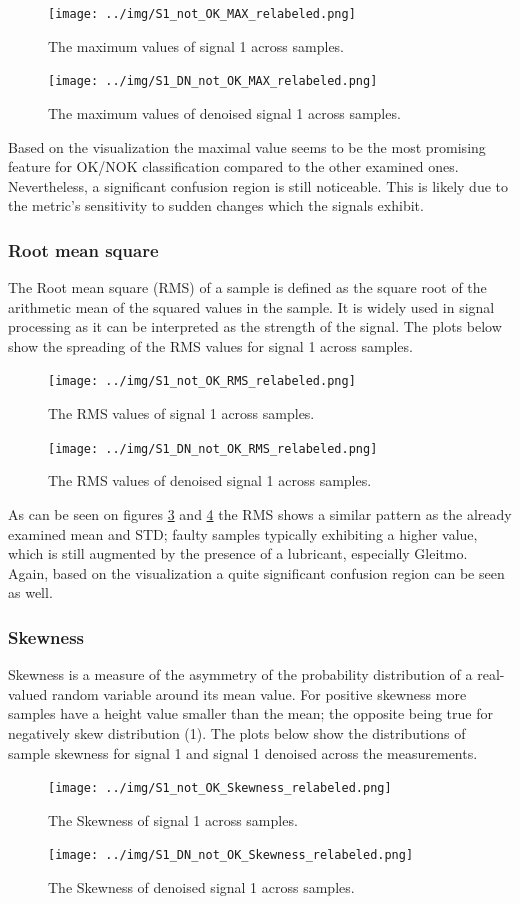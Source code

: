 \documentclass[12pt]{report}
\begin{document}
\begin{figure}[H]
	\texttt{[image: ../img/S1\_not\_OK\_MAX\_relabeled.png]}
	\caption{The maximum values of signal 1 across samples.}
	\label{fig:S1MAX}
\end{figure}
\begin{figure}[H]
	\texttt{[image: ../img/S1\_DN\_not\_OK\_MAX\_relabeled.png]}
	\caption{The maximum values of denoised signal 1 across samples.}
	\label{fig:S1DNMAX}
\end{figure}
Based on the visualization the maximal value seems to be the most promising feature for OK/NOK classification compared to the other examined ones. Nevertheless, a significant confusion region is still noticeable. This is likely due to the metric’s sensitivity to sudden changes which the signals exhibit.

\subsubsection{Root mean square}
The Root mean square (RMS) of a sample is defined as the square root of the arithmetic mean of the squared values in the sample. It is widely used in signal processing as it can be interpreted as the strength of the signal. The plots below show the spreading of the RMS values for signal 1 across samples.
\begin{figure}[H]
	\texttt{[image: ../img/S1\_not\_OK\_RMS\_relabeled.png]}
	\caption{The RMS values of signal 1 across samples.}
	\label{fig:S1RMS}
\end{figure}
\begin{figure}[H]
	\texttt{[image: ../img/S1\_DN\_not\_OK\_RMS\_relabeled.png]}
	\caption{The RMS values of denoised signal 1 across samples.}
	\label{fig:S1DNRMS}
\end{figure}
As can be seen on figures \ref{fig:S1RMS} and \ref{fig:S1DNRMS} the RMS shows a similar pattern as the already examined mean and STD; faulty samples typically exhibiting a higher value, which is still augmented by the presence of a lubricant, especially Gleitmo. Again, based on the visualization a quite significant confusion region can be seen as well.

\subsubsection{Skewness}
Skewness is a measure of the asymmetry of the probability distribution of a real-valued random variable around its mean value. For positive skewness more samples have a height value smaller than the mean; the opposite being true for negatively skew distribution (1). The plots below show the distributions of sample skewness for signal 1 and signal 1 denoised across the measurements.
\begin{figure}[H]
	\texttt{[image: ../img/S1\_not\_OK\_Skewness\_relabeled.png]}
	\caption{The Skewness of signal 1 across samples.}
	\label{fig:S1SK}
\end{figure}
\begin{figure}[H]
	\texttt{[image: ../img/S1\_DN\_not\_OK\_Skewness\_relabeled.png]}
	\caption{The Skewness of denoised signal 1 across samples.}
	\label{fig:S1DNSK}
\end{figure}
\end{document}
